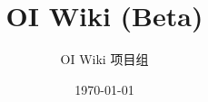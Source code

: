 \documentclass[10pt,a4paper,openany]{book}
\title{OI Wiki (Beta)}
\author{OI Wiki 项目组}
\date{\today}
\begin{document}
\maketitle
\renewcommand{\baselinestretch}{1.2}\normalsize %
\setlength{\parskip}{0\baselineskip}
\renewcommand{\headrulewidth}{0mm} %
\makeatletter
\let\@afterindentfalse\@afterindenttrue
\@afterindenttrue
\makeatother
\setlength{\parindent}{2em} %
\setlength{\tabcolsep}{2pt} %
\frontmatter
\tableofcontents
\clearpage
\mainmatter

\end{document}
